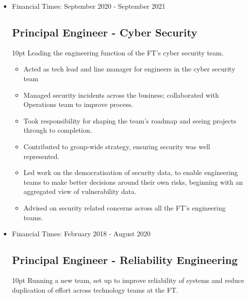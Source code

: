 \documentclass[a4paper]{article}
\newenvironment{detail}{\begin{adjustwidth}{10pt}{}}{\end{adjustwidth}}
\begin{document}
\begin{itemize}
\item Financial Times: September 2020 - September 2021
\subsection*{Principal Engineer - Cyber Security}
\begin{detail}
Leading the engineering function of the FT's cyber security team.

\begin{itemize}
	\item Acted as tech lead and line manager for engineers in the cyber security team
	\item Managed security incidents across the business; collaborated with Operations team to improve process.
	\item Took responsibility for shaping the team's roadmap and seeing projects through to completion.
	\item Contributed to group-wide strategy, ensuring security was well represented.
	\item Led work on the democratisation of security data, to enable engineering teams to make better decisions around their own risks, beginning with an aggregated view of vulnerability data.
	\item Advised on security related concerns across all the FT's engineering teams.
\end{itemize}
\end{detail}

\pagebreak

\item Financial Times: February 2018 - August 2020
\subsection*{Principal Engineer - Reliability Engineering}
\begin{detail}
Running a new team, set up to improve reliability of systems and reduce duplication of effort across technology teams at the FT.


\end{detail}
\end{itemize}
\end{document}

